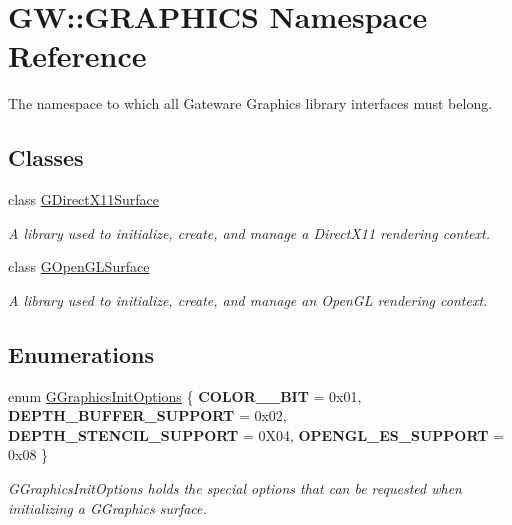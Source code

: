 \hypertarget{namespaceGW_1_1GRAPHICS}{}\section{GW\+:\+:G\+R\+A\+P\+H\+I\+CS Namespace Reference}
\label{namespaceGW_1_1GRAPHICS}


The namespace to which all Gateware Graphics library interfaces must belong.  


\subsection*{Classes}
\begin{DoxyCompactItemize}
\item 
class \hyperlink{classGW_1_1GRAPHICS_1_1GDirectX11Surface}{G\+Direct\+X11\+Surface}
\begin{DoxyCompactList}\small\item\em A library used to initialize, create, and manage a Direct\+X11 rendering context. \end{DoxyCompactList}\item 
class \hyperlink{classGW_1_1GRAPHICS_1_1GOpenGLSurface}{G\+Open\+G\+L\+Surface}
\begin{DoxyCompactList}\small\item\em A library used to initialize, create, and manage an Open\+GL rendering context. \end{DoxyCompactList}\end{DoxyCompactItemize}
\subsection*{Enumerations}
\begin{DoxyCompactItemize}
\item 
\mbox{\label{namespaceGW_1_1GRAPHICS_afbd9d6f65375744d2338ce060d42c85b}} 
enum \hyperlink{namespaceGW_1_1GRAPHICS_afbd9d6f65375744d2338ce060d42c85b}{G\+Graphics\+Init\+Options} \{ {\bfseries C\+O\+L\+O\+R\+\_\+\_\+\+B\+IT} = 0x01, 
{\bfseries D\+E\+P\+T\+H\+\_\+\+B\+U\+F\+F\+E\+R\+\_\+\+S\+U\+P\+P\+O\+RT} = 0x02, 
{\bfseries D\+E\+P\+T\+H\+\_\+\+S\+T\+E\+N\+C\+I\+L\+\_\+\+S\+U\+P\+P\+O\+RT} = 0\+X04, 
{\bfseries O\+P\+E\+N\+G\+L\+\_\+\+E\+S\+\_\+\+S\+U\+P\+P\+O\+RT} = 0x08
 \}\begin{DoxyCompactList}\small\item\em G\+Graphics\+Init\+Options holds the special options that can be requested when initializing a G\+Graphics surface. \end{DoxyCompactList}
\end{DoxyCompactItemize}
